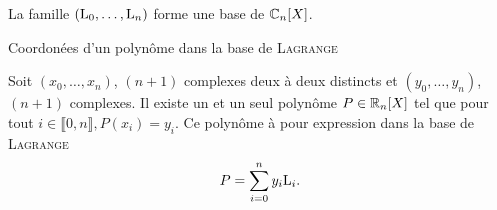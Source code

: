 \begin{prop}
    La famille $(\mathrm{L}_0, \dots, \mathrm{L}_n)$ forme une base de $\mathbb{C}_n[X]$.
\end{prop}

\begin{preuve}

\end{preuve}

Coordonées d'un polynôme dans la base de \textsc{Lagrange}

\begin{prop}

Soit $(x_0, \dots, x_n)$, $(n+1)$ complexes deux à deux distincts et $(y_0, \dots, y_n)$, $(n+1)$ complexes. Il existe un et un seul polynôme $P \in \mathbb{R}_n[X]$ tel que pour tout $i \in \llbracket 0, n \rrbracket, P(x_i) = y_i$. Ce polynôme à pour expression dans la base de \textsc{Lagrange}
$$P = \sum_{i=0}^n y_i \mathrm{L}_i.$$
\end{prop}

\begin{marginfigure}[-5cm]
    
\end{marginfigure}
